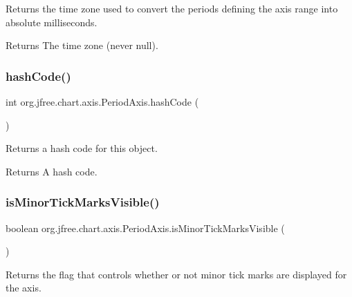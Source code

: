 Returns the time zone used to convert the periods defining the axis range into absolute milliseconds.

\begin{DoxyReturn}{Returns}
The time zone (never {\ttfamily null}). 
\end{DoxyReturn}
\mbox{\label{classorg_1_1jfree_1_1chart_1_1axis_1_1_period_axis_ab360ac06b40342bc1c31853ad32152dc}} 
\subsubsection{\texorpdfstring{hash\+Code()}{hashCode()}}
{\footnotesize\ttfamily int org.\+jfree.\+chart.\+axis.\+Period\+Axis.\+hash\+Code (\begin{DoxyParamCaption}{ }\end{DoxyParamCaption})}

Returns a hash code for this object.

\begin{DoxyReturn}{Returns}
A hash code. 
\end{DoxyReturn}
\mbox{\label{classorg_1_1jfree_1_1chart_1_1axis_1_1_period_axis_aa99bf2aefbdc6e2909fc66539dfe921a}} 
\subsubsection{\texorpdfstring{is\+Minor\+Tick\+Marks\+Visible()}{isMinorTickMarksVisible()}}
{\footnotesize\ttfamily boolean org.\+jfree.\+chart.\+axis.\+Period\+Axis.\+is\+Minor\+Tick\+Marks\+Visible (\begin{DoxyParamCaption}{ }\end{DoxyParamCaption})}

Returns the flag that controls whether or not minor tick marks are displayed for the axis.

